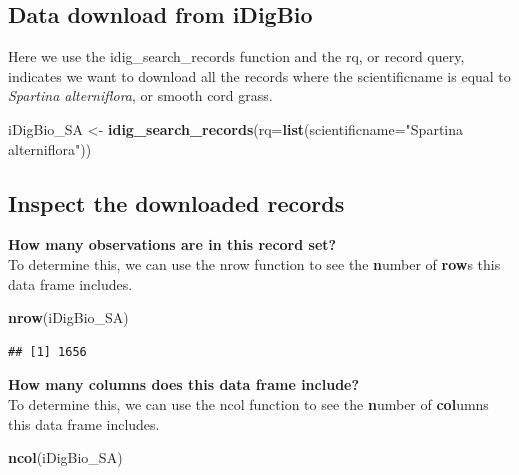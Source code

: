 \documentclass[
]{book}
\newenvironment{Shaded}{\begin{snugshade}}{\end{snugshade}}
\newcommand{\DataTypeTok}[1]{\textcolor[rgb]{0.13,0.29,0.53}{#1}}
\newcommand{\KeywordTok}[1]{\textcolor[rgb]{0.13,0.29,0.53}{\textbf{#1}}}
\newcommand{\NormalTok}[1]{#1}
\newcommand{\StringTok}[1]{\textcolor[rgb]{0.31,0.60,0.02}{#1}}
\begin{document}
\hypertarget{data-download-from-idigbio}{%
\subsection*{Data download from iDigBio}\label{data-download-from-idigbio}}

Here we use the idig\_search\_records function and the rq, or record query, indicates we want to download all the records where the scientificname is equal to \emph{Spartina alterniflora}, or smooth cord grass.

\begin{Shaded}
\begin{Highlighting}[]
\NormalTok{iDigBio\_SA \textless{}{-}}\StringTok{ }\KeywordTok{idig\_search\_records}\NormalTok{(}\DataTypeTok{rq=}\KeywordTok{list}\NormalTok{(}\DataTypeTok{scientificname=}\StringTok{"Spartina alterniflora"}\NormalTok{))}
\end{Highlighting}
\end{Shaded}

\hypertarget{inspect-the-downloaded-records}{%
\subsection*{Inspect the downloaded records}\label{inspect-the-downloaded-records}}

\textbf{How many observations are in this record set?}\\
To determine this, we can use the nrow function to see the \textbf{n}umber of \textbf{row}s this data frame includes.

\begin{Shaded}
\begin{Highlighting}[]
\KeywordTok{nrow}\NormalTok{(iDigBio\_SA)}
\end{Highlighting}
\end{Shaded}

\begin{verbatim}
## [1] 1656
\end{verbatim}

\textbf{How many columns does this data frame include?}\\
To determine this, we can use the ncol function to see the \textbf{n}umber of \textbf{col}umns this data frame includes.

\begin{Shaded}
\begin{Highlighting}[]
\KeywordTok{ncol}\NormalTok{(iDigBio\_SA)}
\end{Highlighting}
\end{Shaded}
\end{document}
